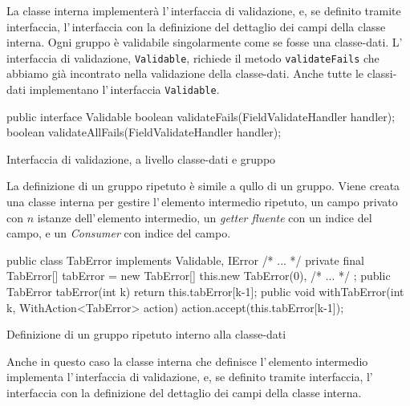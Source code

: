 \documentclass[a4paper,10pt]{report}
\newenvironment{elisting}[1][H]
  {\captionsetup{aboveskip=0pt}\begin{listing}[#1]}
  {\end{listing}%
}
\begin{document}
La classe interna implementerà l'\,interfaccia di validazione, e, se definito
tramite interfaccia, l'\,interfaccia con la definizione del dettaglio dei campi
della classe interna.
Ogni gruppo è validabile singolarmente come se fosse una classe-dati.
L'\,interfaccia di validazione, \texttt{Validable}, richiede il metodo
\texttt{validateFails} che abbiamo già incontrato nella validazione della
classe-dati. Anche tutte le classi-dati implementano l'\,interfaccia 
\texttt{Validable}.

\begin{elisting}[!htb]
\begin{javacode}
public interface Validable {
    boolean validateFails(FieldValidateHandler handler);
    boolean validateAllFails(FieldValidateHandler handler);
}
\end{javacode}
\caption{Interfaccia di validazione, a livello classe-dati e gruppo}
\label{lst:if.validable}
\end{elisting}

La definizione di un gruppo ripetuto è simile a qullo di un gruppo.
Viene creata una classe interna per gestire l'\,elemento 
intermedio ripetuto, un campo privato con $n$ istanze dell'\,elemento 
intermedio, un \textit{getter fluente} con un indice del campo, 
e un \textit{Consumer} con indice del campo.

\begin{elisting}[!htb]
\begin{javacode}
    public class TabError implements Validable, IError {/* ... */}
    private final TabError[] tabError = new TabError[] {
        this.new TabError(0),
        /* ... */
    };
    public TabError tabError(int k) { return this.tabError[k-1]; }
    public void withTabError(int k, WithAction<TabError> action) { action.accept(this.tabError[k-1]); }
\end{javacode}
\caption{Definizione di un gruppo ripetuto interno alla classe-dati}
\label{lst:occ.indef}
\end{elisting}

Anche in questo caso la classe interna che definisce l'\,elemento intermedio 
implementa l'\,interfaccia di validazione, e, se definito tramite interfaccia, 
l'\,interfaccia con la definizione del dettaglio dei campi della classe interna.
\end{document}
